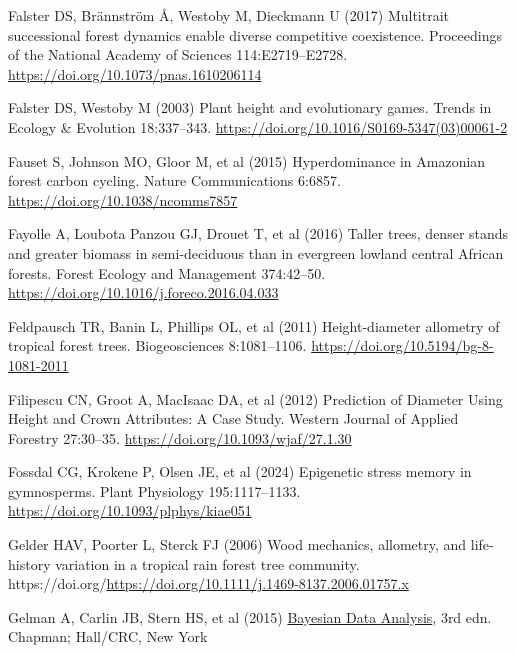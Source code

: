 \documentclass[
  12pt,
  letterpaper,
  DIV=11,
  numbers=noendperiod]{scrartcl}
\newlength{\cslhangindent}
\newlength{\cslentryspacingunit} %
\newenvironment{CSLReferences}[2] %
 {%
  \setlength{\parindent}{0pt}
  \ifodd #1
  \let\oldpar\par
  \def\par{\hangindent=\cslhangindent\oldpar}
  \fi
  \setlength{\parskip}{#2\cslentryspacingunit}
 }%
 {}
\begin{document}
\begin{CSLReferences}{1}{0}
\leavevmode{}%
Falster DS, Brännström Å, Westoby M, Dieckmann U (2017) Multitrait
successional forest dynamics enable diverse competitive coexistence.
Proceedings of the National Academy of Sciences 114:E2719--E2728.
\url{https://doi.org/10.1073/pnas.1610206114}

\leavevmode{}%
Falster DS, Westoby M (2003) Plant height and evolutionary games. Trends
in Ecology \& Evolution 18:337--343.
\url{https://doi.org/10.1016/S0169-5347(03)00061-2}

\leavevmode{}%
Fauset S, Johnson MO, Gloor M, et al (2015) Hyperdominance in
{Amazonian} forest carbon cycling. Nature Communications 6:6857.
\url{https://doi.org/10.1038/ncomms7857}

\leavevmode{}%
Fayolle A, Loubota Panzou GJ, Drouet T, et al (2016) Taller trees,
denser stands and greater biomass in semi-deciduous than in evergreen
lowland central {African} forests. Forest Ecology and Management
374:42--50. \url{https://doi.org/10.1016/j.foreco.2016.04.033}

\leavevmode{}%
Feldpausch TR, Banin L, Phillips OL, et al (2011) Height-diameter
allometry of tropical forest trees. Biogeosciences 8:1081--1106.
\url{https://doi.org/10.5194/bg-8-1081-2011}

\leavevmode{}%
Filipescu CN, Groot A, MacIsaac DA, et al (2012) Prediction of
{Diameter} {Using} {Height} and {Crown} {Attributes}: {A} {Case}
{Study}. Western Journal of Applied Forestry 27:30--35.
\url{https://doi.org/10.1093/wjaf/27.1.30}

\leavevmode{}%
Fossdal CG, Krokene P, Olsen JE, et al (2024) Epigenetic stress memory
in gymnosperms. Plant Physiology 195:1117--1133.
\url{https://doi.org/10.1093/plphys/kiae051}

\leavevmode{}%
Gelder HAV, Poorter L, Sterck FJ (2006) Wood mechanics, allometry, and
life‐history variation in a tropical rain forest tree community.
https://doi.org/\url{https://doi.org/10.1111/j.1469-8137.2006.01757.x}

\leavevmode{}%
Gelman A, Carlin JB, Stern HS, et al (2015)
\href{https://doi.org/10.1201/b16018}{Bayesian {Data} {Analysis}}, 3rd
edn. Chapman; Hall/CRC, New York


\end{CSLReferences}
\end{document}
